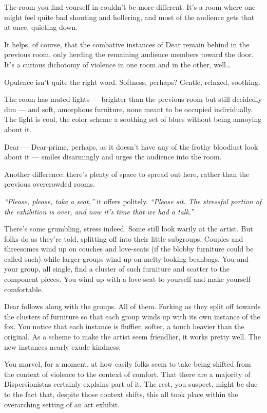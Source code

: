 \newpage

The room you find yourself in couldn't be more different. It's a room where one might feel quite bad shouting and hollering, and most of the audience gets that at once, quieting down.

It helps, of course, that the combative instances of Dear remain behind in the previous room, only herding the remaining audience members toward the door. It's a curious dichotomy of violence in one room and in the other, well\ldots{}

Opulence isn't quite the right word. Softness, perhaps? Gentle, relaxed, soothing.

The room has muted lights --- brighter than the previous room but still decidedly dim --- and soft, amorphous furniture, none meant to be occupied individually. The light is cool, the color scheme a soothing set of blues without being annoying about it.

Dear --- Dear-prime, perhaps, as it doesn't have any of the frothy bloodlust look about it --- smiles disarmingly and urges the audience into the room.

Another difference: there's plenty of space to spread out here, rather than the previous overcrowded rooms.

\emph{``Please, please, take a seat,''} it offers politely. \emph{``Please sit. The stressful portion of the exhibition is over, and now it's time that we had a talk.''}

There's some grumbling, stress indeed. Some still look warily at the artist. But folks do as they're told, splitting off into their little subgroups. Couples and threesomes wind up on couches and love-seats (if the blobby furniture could be called such) while larger groups wind up on melty-looking beanbags. You and your group, all single, find a cluster of such furniture and scatter to the component pieces. You wind up with a love-seat to yourself and make yourself comfortable.

Dear follows along with the groups. All of them. Forking as they split off towards the clusters of furniture so that each group winds up with its own instance of the fox. You notice that each instance is fluffier, softer, a touch heavier than the original. As a scheme to make the artist seem friendlier, it works pretty well. The new instances nearly exude kindness.

You marvel, for a moment, at how easily folks seem to take being shifted from the context of violence to the context of comfort. That there are a majority of Dispersionistas certainly explains part of it. The rest, you suspect, might be due to the fact that, despite those context shifts, this all took place within the overarching setting of an art exhibit.

